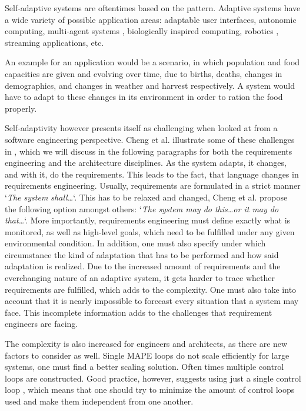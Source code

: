    \quad Self-adaptive systems are oftentimes based on the  pattern.
    Adaptive systems have a wide variety of possible application areas: adaptable user interfaces, autonomic computing, multi-agent systems \cite{Cheng:2009:SES:1573856.1573858}, 
    biologically inspired computing, robotics \cite{10.1007/978-3-319-59480-4_44}, streaming applications, etc.

    \quad An example for an application would be a scenario, in which population and food capacities are given and evolving over time, due to births, deaths, changes in demographics, 
    and changes in weather and harvest respectively. A system would have to adapt to these changes in its environment in order to ration the food properly.

    \quad Self-adaptivity however presents itself as challenging when looked at from a software engineering perspective.
    Cheng et al. illustrate some of these challenges in \cite{Cheng:2009:SES:1573856.1573858}, which we will discuss in the following paragraphs for both the 
    requirements engineering and the architecture disciplines.
    As the system adapts, it changes, and with it, do the requirements. This leads to the fact, that language changes in requirements engineering.
    Usually, requirements are formulated in a strict manner `\textit{The system shall\ldots}`. This has to be relaxed and changed, Cheng et al. propose the following 
    option amongst others: `\textit{The system may do this\ldots or it may do that\ldots}`.
    More importantly, requirements engineering must define exactly what is monitored, as well as high-level goals, which need to be fulfilled under any given environmental condition.
    In addition, one must also specify under which circumstance the kind of adaptation that has to be performed and how said adaptation is realized.
    Due to the increased amount of requirements and the everchanging nature of an adaptive system, it gets harder to trace whether requirements are fulfilled, which adds to the complexity.
    One must also take into account that it is nearly impossible to forecast every situation that a system may face. 
    This incomplete information adds to the challenges that requirement engineers are facing.

    \quad The complexity is also increased for engineers and architects, as there are new factors to consider as well.
    Single MAPE loops do not scale efficiently for large systems, one must find a better scaling solution. Often times multiple control loops are constructed.
    Good practice, however, suggests using just a single control loop \cite{accidents}, which means that one should try to minimize the amount of control loops used and
    make them independent from one another.
    
